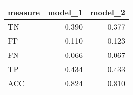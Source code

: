 \begin{tabular}{lrr}
\toprule
measure &  model\_1 &  model\_2 \\
\midrule
     TN &    0.390 &    0.377 \\
     FP &    0.110 &    0.123 \\
     FN &    0.066 &    0.067 \\
     TP &    0.434 &    0.433 \\
    ACC &    0.824 &    0.810 \\
\bottomrule
\end{tabular}
